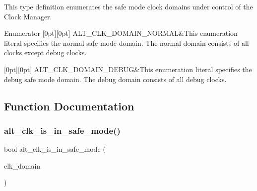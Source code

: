 This type definition enumerates the safe mode clock domains under control of the Clock Manager. \begin{DoxyEnumFields}{Enumerator}
[0pt][0pt]{}\mbox{\label{group__CLK__MGR__SAFE__MODE_gga8feb75a3bd96f3d639ed8052133c9029ae0c540cb09d7d1a2c7ec1456245cd61d}} 
A\+L\+T\+\_\+\+C\+L\+K\+\_\+\+D\+O\+M\+A\+I\+N\+\_\+\+N\+O\+R\+M\+AL&This enumeration literal specifies the normal safe mode domain. The normal domain consists of all clocks except debug clocks. \\
\hline

[0pt][0pt]{}\mbox{\label{group__CLK__MGR__SAFE__MODE_gga8feb75a3bd96f3d639ed8052133c9029a3c53d968ed9db9bebdb74c8b350a99ef}} 
A\+L\+T\+\_\+\+C\+L\+K\+\_\+\+D\+O\+M\+A\+I\+N\+\_\+\+D\+E\+B\+UG&This enumeration literal specifies the debug safe mode domain. The debug domain consists of all debug clocks. \\
\hline

\end{DoxyEnumFields}


\subsection{Function Documentation}
\mbox{\label{group__CLK__MGR__SAFE__MODE_gada82c454b74519f10ce1769e1273608a}} 
\subsubsection{\texorpdfstring{alt\_clk\_is\_in\_safe\_mode()}{alt\_clk\_is\_in\_safe\_mode()}}
{\footnotesize\ttfamily bool alt\+\_\+clk\+\_\+is\+\_\+in\+\_\+safe\+\_\+mode (\begin{DoxyParamCaption}\item[{\mbox{\hyperlink{group__CLK__MGR__SAFE__MODE_gacf9924b29261719c075137e2805f8d3f}{A\+L\+T\+\_\+\+C\+L\+K\+\_\+\+S\+A\+F\+E\+\_\+\+D\+O\+M\+A\+I\+N\+\_\+t}}}]{clk\+\_\+domain }\end{DoxyParamCaption})}

